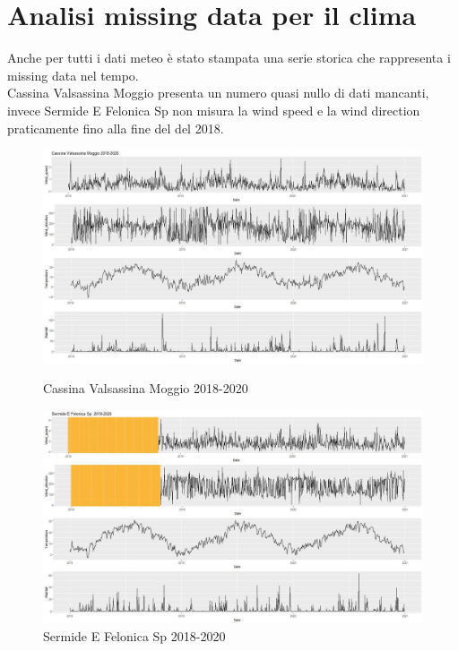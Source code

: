 \documentclass{article}
\begin{document}
\section{Analisi missing data per il clima}
Anche per tutti i dati meteo è stato stampata una serie storica che rappresenta i missing data nel tempo.
\\Cassina Valsassina Moggio presenta un numero quasi nullo di dati mancanti, invece Sermide E Felonica Sp 
non misura la wind speed e la wind direction praticamente fino alla fine del del 2018.
\begin{figure}[h!]
  \centering
  \includegraphics[scale=0.35]{Picture/Cassina Valsassina Moggio 2018-2020 .jpeg} 
  \caption{Cassina Valsassina Moggio 2018-2020}
  \centering
  \includegraphics[scale=0.35]{Picture/Sermide.jpeg}
  \caption{Sermide E Felonica Sp  2018-2020}
\end{figure}
\end{document}
